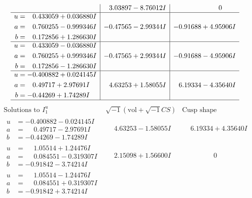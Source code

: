 \documentclass[1p]{elsarticle_modified}
\theoremstyle{definition}
\newcommand{\I}{\sqrt{-1}}
\begin{document}
$$\begin{array}{c|c|c}
 & \phantom{-}3.03897 - 8.76012 I & \phantom{-0.000000 } 0 \\ \hline\begin{aligned}
u &= \phantom{-}0.433059 + 0.036880 I \\
a &= \phantom{-}0.760255 - 0.999346 I \\
b &= \phantom{-}0.172856 + 1.286630 I\end{aligned}
 & -0.47565 - 2.99344 I & -0.91688 + 4.95906 I \\ \hline\begin{aligned}
u &= \phantom{-}0.433059 - 0.036880 I \\
a &= \phantom{-}0.760255 + 0.999346 I \\
b &= \phantom{-}0.172856 - 1.286630 I\end{aligned}
 & -0.47565 + 2.99344 I & -0.91688 - 4.95906 I \\ \hline\begin{aligned}
u &= -0.400882 + 0.024145 I \\
a &= \phantom{-}0.49717 + 2.97691 I \\
b &= -0.44269 + 1.74289 I\end{aligned}
 & \phantom{-}4.63253 + 1.58055 I & \phantom{-}6.19334 - 4.35640 I\\
 \hline 
 \end{array}$$\newpage$$\begin{array}{c|c|c}  
\text{Solutions to }I^u_{1}& \I (\text{vol} + \sqrt{-1}CS) & \text{Cusp shape}\\
 \hline 
\begin{aligned}
u &= -0.400882 - 0.024145 I \\
a &= \phantom{-}0.49717 - 2.97691 I \\
b &= -0.44269 - 1.74289 I\end{aligned}
 & \phantom{-}4.63253 - 1.58055 I & \phantom{-}6.19334 + 4.35640 I \\ \hline\begin{aligned}
u &= \phantom{-}1.05514 + 1.24476 I \\
a &= \phantom{-}0.084551 - 0.319307 I \\
b &= -0.91842 - 3.74214 I\end{aligned}
 & \phantom{-}2.15098 + 1.56600 I & \phantom{-0.000000 } 0 \\ \hline\begin{aligned}
u &= \phantom{-}1.05514 - 1.24476 I \\
a &= \phantom{-}0.084551 + 0.319307 I \\
b &= -0.91842 + 3.74214 I\end{aligned}

\end{array}$$
\end{document}
